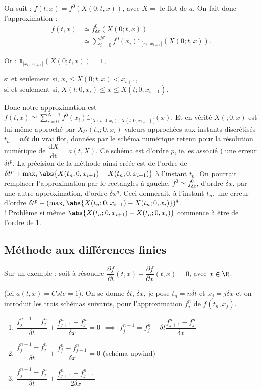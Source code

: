 \documentclass[12pt,a4paper]{article}
\newcommand\diff[2]{\dfrac{\partial #1}{\partial #2}}
\newcommand\deriv[2]{\dfrac{\mathrm{d}#1}{\mathrm{d#2}}}
\begin{document}
	On suit : $f(t,x) = f^0(X(0;t,x))$, avec $X = $ le flot de $a$. On fait donc l'approximation :
	\[
		\begin{aligned}
			f(t,x) &\simeq f_{\delta x}^0(X(0;t,x)) \\
			&\simeq \sum_{i=0}^N f^0(x_i) \mathbb1_{[x_i,\,x_{i+1}[}(X(0;t,x)).
		\end{aligned}
	\]
	
	Or : $\mathbb1_{[x_i,\,x_{i+1}[}(X(0;t,x)) = 1$,\begin{minipage}[t]{15cm}
		 si et seulement si, $x_i \leq X(0;t,x) < x_{i+1}$,\\
		 si et seulement si, $X(t;0,x_i) \leq x \leq X(t;0,x_{i+1})$.
	\end{minipage}
	
	Donc notre approximation est $f(t,x) \simeq \displaystyle\sum_{i=0}^{N-1} f^0(x_i)\mathbb1_{[X(t;0,x_i),\,X(t;0,x_{i+1})[}(x)$. Et en vérité $X(;0,x)$ est lui-même approché par $X_{\delta t}(t_n;0,x_i)$ valeurs approchées aux instants discrétisés $t_n = n \delta t$ du vrai flot, données par le schéma numérique retenu pour la résolution numérique de $\deriv Xt = a(t,X)$. Ce schéma est d'ordre $p$, ie. es associé ) une erreur $\delta t^p$. La précision de la méthode ainsi créée est de l'ordre  de $\delta t^p + \max_i \abs{X(t_n;0,x_{i+1})-X(t_n;0,x_{i+1})}$ à l'instant $t_n$. On pourrait remplacer l'approximation par le rectangles à gauche. $f^0 \simeq f_{\delta x}^0$, d'ordre $\delta x$, par une autre approximation, d'ordre $\delta x^q$. Ceci donnerait, à l'instant $t_n$, une erreur d'ordre $\delta t^p + \left(\max_i \abs{X(t_n; 0 , x_{i+1}) - X(t_n;0,x_i)}\right)^q$.\\
	\textcolor{red}{!} Problème si même $\abs{X(t_n;0,x_{i+1})-X(t_n;0,x_i)}$ commence à être de l'ordre de 1.
	
	\subsection{Méthode aux différences finies}
	
	Sur un exemple : soit à résoudre $\diff ft(t,x) + \diff fx(t,x) = 0$, avec $x \in \R$.
	
	(ici $a(t,x) = Cste = 1$). On se donne $\delta t$, $\delta x$, je pose $t_n = n \delta t$ et $x_j = j \delta x$ et on introduit les trois schémas suivants, pour l'approximation $f_j^n$ de $f(t_n,x_j)$.
	
	\begin{enumerate}[label=\textbullet]
		\item $\dfrac{f_j^{n+1}-f_j^n}{\delta t} + \dfrac{f_{j+1}^n - f_{j}^n}{\delta x} = 0$ $\implies$ $f_j^{n+1} = f_j^n - \delta t \dfrac{f_{j+1}^n-f_j^n}{\delta x}$
		\item $\dfrac{f_j^{n+1}-f_j^n}{\delta t} + \dfrac{f_j^n-f_{j-1}^n}{\delta x} = 0$ (schéma upwind)
		\item $\dfrac{f_j^{n+1}-f_j^n}{\delta t} + \dfrac{f_{j+1}^n-f_{j-1}^n}{2\delta x}$
	\end{enumerate}
	
\end{document}
